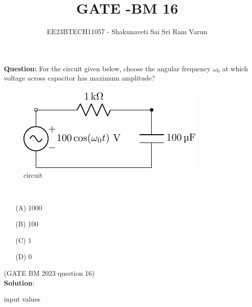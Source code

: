 \documentclass[journal,12pt,twocolumn]{IEEEtran}
\theoremstyle{remark}
\begin{document}

\vspace{3cm}

\title{GATE -BM 16}
\author{EE23BTECH11057 - Shakunaveti Sai Sri Ram Varun$^{}$%
}
\maketitle
\newpage
\bigskip
\vspace{2cm}
\textbf{Question: }
For the circuit given below, choose the angular frequency $ \omega_0$ at which voltage across capacitor has maximum amplitude?
\begin{figure}[h!]
    \includegraphics[width = \columnwidth]{2023/BM/16/figs/c_fig1.pdf}
    \caption{circuit }
    \centering
    \label{fig: bm_16_fig_1}
\end{figure}\\
\begin{enumerate}
    \item[(A)] 1000\\
    \item[(B)] 100\\
    \item[(C)] 1\\
    \item[(D)] 0   
\end{enumerate}
\hfill(GATE BM 2023 question 16)\\
\textbf{Solution}:\\
\fi
\begin{table}[h!] 
\centering

\caption{input values}
\label{tab: table-bm16}
\end{table}
\end{document}
